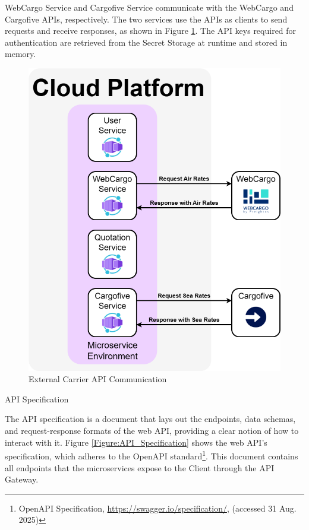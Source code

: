 \documentclass[12pt, reqno, oneside]{amsbook}
\makeatletter
\def\section{\@startsection{section}{1}%
      \z@{.5\linespacing\@plus.7\linespacing}{.25\linespacing}%
      {\normalfont\bfseries\flushleft}}
\theoremstyle{definition}
\theoremstyle{definition}
\numberwithin{section}{chapter}
\numberwithin{table}{chapter}
\numberwithin{figure}{chapter}
\makeatother
\begin{document}
WebCargo Service and Cargofive Service communicate with the WebCargo and Cargofive \acp{API}, respectively. The two services use the \acp{API} as clients to send requests and receive responses, as shown in Figure \ref{Figure:ExternalCarrierAPICommunication}. The \ac{API} keys required for authentication are retrieved from the Secret Storage at runtime and stored in memory.

\begin{figure}[H]
  \centering
  \includegraphics[width=0.9\linewidth]{images/ExternalCarrierAPICommunication.png}
  \caption{\label{Figure:ExternalCarrierAPICommunication}External Carrier \ac{API} Communication}
\end{figure}

\pagebreak

\section{\texorpdfstring{\ac{API}}{API} Specification}
\label{Section:API_Specification}

The \ac{API} specification is a document that lays out the endpoints, data schemas, and request-response formats of the web \ac{API}, providing a clear notion of how to interact with it. Figure \ref{Figure:API_Specification} shows the web \ac{API}'s specification, which adheres to the OpenAPI standard\footnote{OpenAPI Specification, \url{https://swagger.io/specification/}, (accessed 31 Aug. 2025)}. This document contains all endpoints that the microservices expose to the Client through the \ac{API} Gateway.
\end{document}
